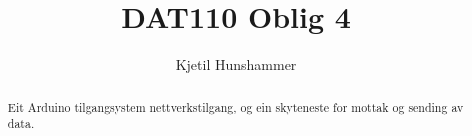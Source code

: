 \documentclass[11pt]{article}
\begin{document}
\title{DAT110 Oblig 4}

\author{Kjetil Hunshammer}

\maketitle

\begin{abstract}
Eit Arduino tilgangsystem nettverkstilgang, og ein skyteneste for mottak og sending av data.
\end{abstract}
\pagebreak
















\end{document}

